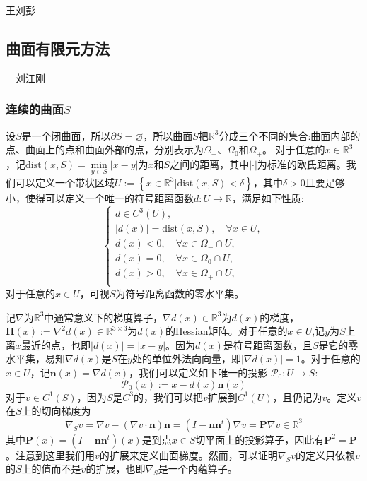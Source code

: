 {\color{red}\begin{center}
     王刘彭
\end{center}}

\subsection{曲面有限元方法}
{\color{red}\begin{center}
    　刘江刚
\end{center}}
\subsubsection{连续的曲面$S$}
设$S$是一个闭曲面，所以$\partial S=\varnothing$，所以曲面$S$把$\mathbb{R}^3$分成三个不同的集合:曲面内部的点、曲面上的点和曲面外部的点，分别表示为$\Omega_{-}$、$\Omega_0$和$\Omega_{+}$。 对于任意的$x\in\mathbb{R}^3$，记$\mathrm{dist}(x,S)=\min\limits_{y\in S}\left|x-y\right|$为$x$和$S$之间的距离，其中$|\cdot|$为标准的欧氏距离。我们可以定义一个带状区域$U:=\left\{x\in\mathbb{R}^3|\mathrm{dist}(x,S)<\delta\right\}$，其中$\delta>0$且要足够小，使得可以定义一个唯一的符号距离函数$d:U\rightarrow\mathbb{R}$，满足如下性质:
\begin{equation}\label{eq:MA}
\left\{
\begin{array}{l}
d\in C^3(U),\\
|d(x)|=\mathrm{dist}(x,S),\quad \forall x\in U,\\
d(x)< 0,\quad\forall x\in\Omega_{-}\cap U,\\
d(x)= 0,\quad\forall x\in \Omega_0\cap U,\\
d(x)> 0,\quad\forall x\in\Omega_{+}\cap U,\\
\end{array}\right.
\end{equation}
对于任意的$x\in U$，可视$S$为符号距离函数的零水平集。

记$\nabla$为$\mathbb{R}^3$中通常意义下的梯度算子，$\nabla d(x)\in\mathbb{R}^3$为$d(x)$的梯度，$\boldsymbol{H}(x):=\nabla^2d(x)\in\mathbb{R}^{3\times 3}$为$d(x)$的Hessian矩阵。对于任意的$x\in U$,记$y$为$S$上离$x$最近的点，也即$|d(x)|=\left|x-y\right|$。因为$d(x)$是符号距离函数，且$S$是它的零水平集，易知$\nabla d(x)$是$S$在$y$处的单位外法向向量，即$\left|\nabla d(x)\right|=1$。对于任意的$x\in U$，记$\boldsymbol{n}(x)=\nabla d(x)$，我们可以定义如下唯一的投影
$\mathcal{P}_0:U\rightarrow S$:
\begin{equation}\label{projection}
\mathcal{P}_0(x):=x-d(x)\boldsymbol{n}(x)
\end{equation}
对于$v\in C^1(S)$，因为$S$是$C^3$的，我们可以把$v$扩展到$C^1(U)$，且仍记为$v$。定义$v$在$S$上的切向梯度为
\begin{equation}
\nabla_Sv=\nabla v-(\nabla v\cdot\boldsymbol{n})\boldsymbol{n}=(I-\boldsymbol{n}\boldsymbol{n}^t)\nabla v=\boldsymbol{P}\nabla v\in\mathbb{R}^3
\end{equation}
其中$\boldsymbol{P}(x)=(I-\boldsymbol{n}\boldsymbol{n}^t)(x)$是到点$x\in S$切平面上的投影算子，因此有$\boldsymbol{P}^2=\boldsymbol{P}$。注意到这里我们用$v$的扩展来定义曲面梯度。然而，可以证明$\nabla_Sv$的定义只依赖$v$的$S$上的值而不是$v$的扩展，也即$\nabla_S$是一个内蕴算子。


